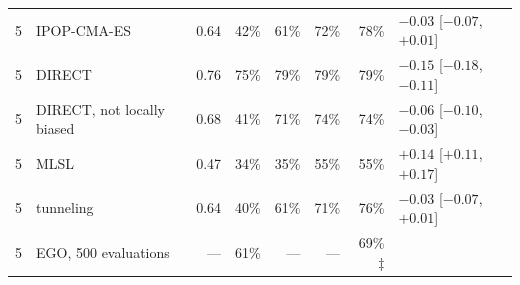 \begin{table}[t]
\begin{tabular}{rlrrrrrl}
    5 & IPOP-CMA-ES & 0.64 & 42\% & 61\% & 72\% & 78\% & $-0.03$ [$-0.07$, $+0.01$] \\
    5 & DIRECT & 0.76 & 75\% & 79\% & 79\% & 79\% & $-0.15$ [$-0.18$, $-0.11$] \\
    5 & DIRECT, not locally biased & 0.68 & 41\% & 71\% & 74\% & 74\% & $-0.06$ [$-0.10$, $-0.03$] \\
    5 & MLSL & 0.47 & 34\% & 35\% & 55\% & 55\% & $+0.14$ [$+0.11$, $+0.17$] \\
    5 & tunneling & 0.64 & 40\% & 61\% & 71\% & 76\% & $-0.03$ [$-0.07$, $+0.01$] \\
    5 & EGO, 500 evaluations & --- & 61\% & --- & --- & 69\%$\ddagger$ &  \\
    \bottomrule
  \end{tabular}
\end{table}
